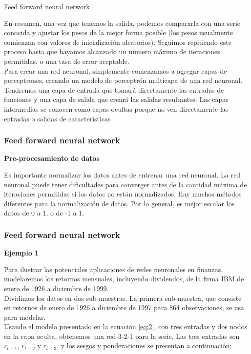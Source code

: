 \documentclass[spanish,xcolor=table]{beamer}
\begin{document}
\begin{section}{Feed forward neural network}
\begin{frame}
En resumen, una vez que tenemos la salida, podemos compararla con una serie conocida y ajustar los pesos de la mejor forma posible (los pesos usualmente comienzan con valores de inicializaci\'on aleatorios). Seguimos repitiendo este proceso hasta que hayamos alcanzado un n\'umero m\'aximo de iteraciones permitidas, o una tasa de error aceptable.\\
Para crear una red neuronal, simplemente comenzamos a agregar capas de perceptrones, creando un modelo de perceptr\'on multicapa de una red neuronal. Tendremos una capa de entrada que tomar\'a directamente las entradas de funciones y una capa de salida que crear\'a las salidas resultantes. Las capas intermedias se conocen como capas ocultas porque no ven directamente las entradas o salidas de caracter\'{i}sticas

\end{frame}
\begin{frame}
\frametitle{Feed forward neural network}
\textbf{Pre-procesamiento de datos}

Es importante normalizar los datos antes de entrenar una red neuronal. La red neuronal puede tener dificultades para converger antes de la cantidad m\'axima de iteraciones permitidas si los datos no están normalizados. Hay muchos m\'etodos diferentes para la normalizaci\'on de datos. Por lo general, es mejor escalar los datos de 0 a 1, o de -1 a 1. 

\end{frame}
\begin{frame}
\frametitle{Feed forward neural network}
\textbf{Ejemplo 1} 

Para ilustrar las potenciales aplicaciones de redes neuronales en finanzas, modelaremos los retornos mensuales, incluyendo dividendos, de la firma IBM de enero de 1926 a diciembre de 1999. \\
Dividimos los datos en dos sub-muestras. La primera sub-muestra, que consiste en retornos de enero de 1926 a diciembre de 1997 para 864 observaciones, se usa para modelar. \\
Usando el modelo presentado en la ecuaci\'on \ref{eq:2}, con tres entradas y dos nodos en la capa oculta, obtenemos una red 3-2-1 para la serie. Las tres entradas son $r_{t-1}$, $r_{t-2}$ y $r_{t-3}$, y los sesgos y ponderaciones se presentan a continuaci\'on:


\end{frame}
\end{section}
\end{document}
